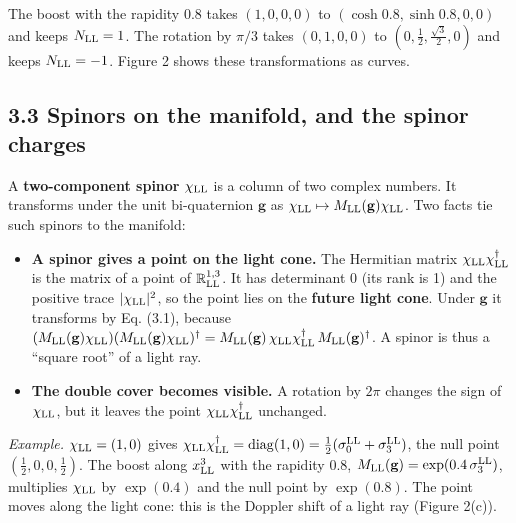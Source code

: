 \documentclass[
  10pt,
]{article}
\providecommand{\tightlist}{%
  \setlength{\itemsep}{0pt}\setlength{\parskip}{0pt}}
\begin{document}
The boost with the rapidity 0.8 takes \((1,0,0,0)\) to
\((\cosh0.8,\sinh0.8,0,0)\) and keeps \(N_{\rm LL}=1\). The rotation by
\(\pi/3\) takes \((0,1,0,0)\) to \((0,\tfrac12,\tfrac{\sqrt3}2,0)\) and
keeps \(N_{\rm LL}=-1\). Figure 2 shows these transformations as curves.

\hypertarget{spinors-on-the-manifold-and-the-spinor-charges}{%
\subsection{3.3 Spinors on the manifold, and the spinor
charges}\label{spinors-on-the-manifold-and-the-spinor-charges}}

A \textbf{two-component spinor} \(\chi_{\rm LL}\) is a column of two
complex numbers. It transforms under the unit bi-quaternion
\(\mathbf g\) as
\(\chi_{\rm LL}\mapsto M_{\rm LL}(\mathbf g)\chi_{\rm LL}\). Two facts
tie such spinors to the manifold:

\begin{itemize}
\tightlist
\item
  \textbf{A spinor gives a point on the light cone.} The Hermitian
  matrix \(\chi_{\rm LL}\chi_{\rm LL}^\dagger\) is the matrix of a point
  of \(\mathbb R^{1,3}_{\rm LL}\). It has determinant 0 (its rank is 1)
  and the positive trace \(\lvert\chi_{\rm LL}\rvert^2\), so the point
  lies on the \textbf{future light cone}. Under \(\mathbf g\) it
  transforms by Eq. (3.1), because
  \((M_{\rm LL}(\mathbf g)\chi_{\rm LL})(M_{\rm LL}(\mathbf g)\chi_{\rm LL})^\dagger=M_{\rm LL}(\mathbf g)\,\chi_{\rm LL}\chi_{\rm LL}^\dagger\,M_{\rm LL}(\mathbf g)^\dagger\).
  A spinor is thus a ``square root'' of a light ray.
\item
  \textbf{The double cover becomes visible.} A rotation by \(2\pi\)
  changes the sign of \(\chi_{\rm LL}\), but it leaves the point
  \(\chi_{\rm LL}\chi_{\rm LL}^\dagger\) unchanged.
\end{itemize}

\emph{Example.} \(\chi_{\rm LL}=(1,0)\) gives
\(\chi_{\rm LL}\chi_{\rm LL}^\dagger=\mathrm{diag}(1,0)=\tfrac12(\sigma^{\rm LL}_0+\sigma^{\rm LL}_3)\),
the null point \((\tfrac12,0,0,\tfrac12)\). The boost along
\(x^3_{\rm LL}\) with the rapidity 0.8,
\(M_{\rm LL}(\mathbf g)=\exp(0.4\,\sigma^{\rm LL}_3)\), multiplies
\(\chi_{\rm LL}\) by \(\exp(0.4)\) and the null point by \(\exp(0.8)\).
The point moves along the light cone: this is the Doppler shift of a
light ray (Figure 2(c)).
\end{document}
